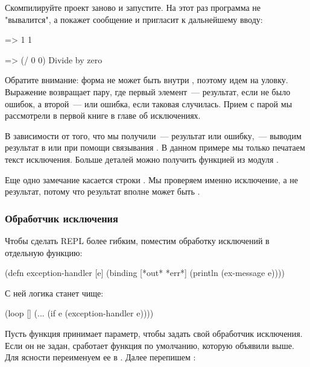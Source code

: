 Скомпилируйте проект заново и запустите. На этот раз программа не "вывалится", а покажет сообщение и пригласит к дальнейшему вводу:

\begin{english}
  \begin{clojure}
=> 1
1

=> (/ 0 0)
Divide by zero
  \end{clojure}
\end{english}

Обратите внимание: форма  не может быть внутри , поэтому идем на уловку. Выражение  возвращает пару, где первый элемент~--- результат, если не было ошибок, а второй~---  или ошибка, если таковая случилась. Прием с парой мы рассмотрели в первой книге в главе об исключениях.

В зависимости от того, что мы получили~--- результат или ошибку,~--- выводим результат в  или  при помощи связывания . В данном примере мы только печатаем текст исключения. Больше деталей можно получить функцией  из модуля .

Еще одно замечание касается строки . Мы проверяем именно исключение, а не результат, потому что результат вполне может быть .

\subsubsection{Обработчик исключения}

Чтобы сделать REPL более гибким, поместим обработку исключений в отдельную функцию:

\begin{english}
  \begin{clojure}
(defn exception-handler [e]
  (binding [*out* *err*]
    (println (ex-message e))))
  \end{clojure}
\end{english}

С ней логика  станет чище:

\begin{english}
  \begin{clojure}
(loop []
  (...
   (if e
     (exception-handler e))))
  \end{clojure}
\end{english}

Пусть функция  принимает параметр, чтобы задать свой обработчик исключения. Если он не задан, сработает функция по умолчанию, которую объявили выше. Для ясности переименуем ее в . Далее перепишем :

